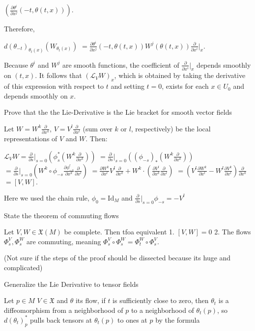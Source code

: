 \(\left( \frac{\partial \theta^i}{\partial x^j}(-t, \theta(t, x)) \right).\)

Therefore,

\(d(\theta_{-t})_{\theta_t(x)}(W_{\theta_t(x)})\)
\(= \frac{\partial \theta^i}{\partial x^j}(-t, \theta(t, x)) W^j(\theta(t, x)) \frac{\partial}{\partial x^i} \bigg|_x.\)

Because \(\theta^i\) and \(W^j\) are smooth functions, the coefficient of \(\frac{\partial}{\partial x^i}|_x\) depends smoothly on \((t, x)\). 
It follows that \((\mathcal{L}_V W)_x\), which is obtained by taking the derivative of this expression with respect to \(t\) 
and setting \(t = 0\), exists for each \(x \in U_0\) and depends smoothly on \(x\).

Prove that the the Lie-Derivative is the Lie bracket for smooth vector fields

Let \(W = W^k \frac{\partial}{\partial x^k}\), \(V = V^l \frac{\partial}{\partial x^l}\) (sum over \(k\) or \(l\), respectively) 
be the local representations of \(V\) and \(W\). Then:

\(\mathcal{L}_V W = \frac{\partial}{\partial s}\bigg|_{s=0} \left( \phi_s^* (W^k \frac{\partial}{\partial x^k} ) \right) \)
\(= \frac{\partial}{\partial s}\bigg|_{s=0} \left( (\phi_{-s})_* (W^k \frac{\partial}{\partial x^k} ) \right)\)
\(= \frac{\partial}{\partial s}\bigg|_{s=0} \left( W^k \circ \phi_{-s} \frac{\partial \phi_{-s}^l}{\partial x^k} \frac{\partial}{\partial x^l} \right)\)
\(= \frac{\partial W^k}{\partial x^l} V^l \frac{\partial}{\partial x^k} + W^k \cdot \left( \frac{\partial V^l}{\partial x^k} \frac{\partial}{\partial x^l} \right)\)
\(= \left( V^l \frac{\partial W^k}{\partial x^l} - W^l \frac{\partial V^k}{\partial x^l} \right) \frac{\partial}{\partial x^k}\)
\(= [V, W].\)

Here we used the chain rule, \(\phi_0 = \text{Id}_M\) and \(\frac{\partial}{\partial s}\bigg|_{s=0} \phi_{-s} = -V^l\)


State the theorem of commuting flows

Let \( V, W \in \mathfrak{X}(M) \) be complete.
Then tfoa equivalent
1. \( [V, W] = 0 \)
2. The flows \( \Phi^V_s, \Phi^W_s \) are commuting, meaning \( \Phi^V_s \circ \Phi^W_s = \Phi^W_t \circ \Phi^V_s \).

(Not sure if the steps of the proof should be dissected because its huge and complicated)


Generalize the Lie Derivative to tensor fields

Let \( p \in M \) \( V \in \mathfrak{X}\) and \( \theta \) its flow, if \(t\) is sufficiently close to zero, 
then \(\theta_t\) is a diffeomorphism from a neighborhood of \(p\) to a neighborhood of \(\theta_t(p)\), 
so \(d(\theta_t)_p^*\) pulls back tensors at \(\theta_t(p)\) to ones at \(p\)
by the formula

